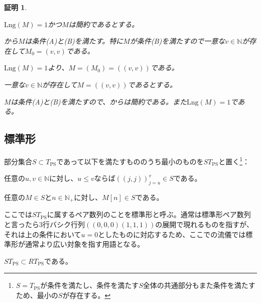 \documentclass[dvipdfmx,uplatex]{jsarticle}
\theoremstyle{customnonumberbreakfortheorem}
\theoremstyle{customnonumberbreakforproof}
\newtheorem{hideableproof}{証明}
\begin{document}
\begin{hideableproof}
	\begin{indented}
		\item \(\textrm{Lng}(M) = 1\)かつ\(M\)は簡約であるとする。
		\begin{indented}
			\item {}から\(M\)は条件(A)と(B)を満たす。特に\(M\)が条件(B)を満たすので一意な\(v \in \mathbb{N}\)が存在して\(M_0 = (v,v)\)である。
			\item \(\textrm{Lng}(M) = 1\)より、\(M = (M_0) = ((v,v))\)である。
		\end{indented}
		\item 一意な\(v \in \mathbb{N}\)が存在して\(M = ((v,v))\)であるとする。
		\begin{indented}
			\item \(M\)は条件(A)と(B)を満たすので、からは簡約である。また\(\textrm{Lng}(M) = 1\)である。
		\end{indented}
	\end{indented}
\end{hideableproof}

\subsection{標準形}

部分集合\(S \subset T_{\textrm{PS}}\)であって以下を満たすもののうち最小のものを\(ST_{\textrm{PS}}\)と置く\footnote{\(S = T_{\textrm{PS}}\)が条件を満たし、条件を満たす\(S\)全体の共通部分もまた条件を満たすため、最小の\(S\)が存在する。}：
\begin{nenumerate}
	\item 任意の\(u,v \in \mathbb{N}\)に対し、\(u \leq v\)ならば\(((j,j))_{j=u}^{v} \in S\)である。
	\item 任意の\(M \in S\)と\(n \in \mathbb{N}_{+}\)に対し、\(M[n] \in S\)である。
\end{nenumerate}

ここでは\(ST_{\textrm{PS}}\)に属するペア数列のことを標準形と呼ぶ。通常は標準形ペア数列と言ったら\(3\)行バシク行列\(((0,0,0)(1,1,1))\)の展開で現れるものを指すが、それは上の条件において\(u = 0\)としたものに対応するため、ここでの流儀では標準形が通常より広い対象を指す用語となる。

\begin{proposition}[標準形の簡約性]\label{標準形の簡約性}
	\(ST_{\textrm{PS}} \subset RT_{\textrm{PS}}\)である。
\end{proposition}
\end{document}

